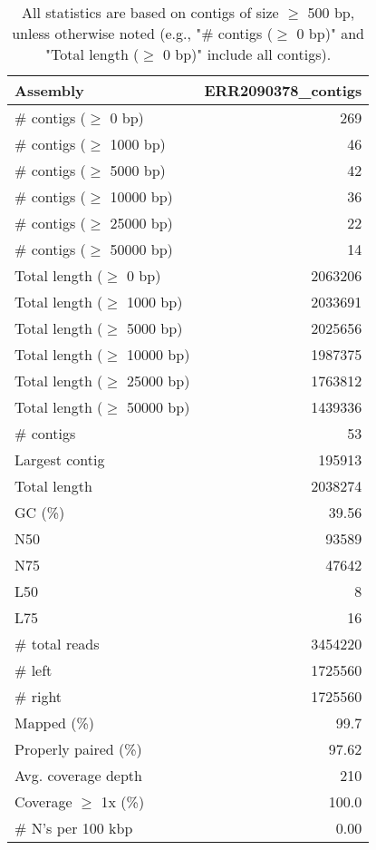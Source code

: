 \documentclass[12pt,a4paper]{article}
\begin{document}
\begin{table}[ht]
\begin{center}
\caption{All statistics are based on contigs of size $\geq$ 500 bp, unless otherwise noted (e.g., "\# contigs ($\geq$ 0 bp)" and "Total length ($\geq$ 0 bp)" include all contigs).}
\begin{tabular}{|l*{1}{|r}|}
\hline
Assembly & ERR2090378\_contigs \\ \hline
\# contigs ($\geq$ 0 bp) & 269 \\ \hline
\# contigs ($\geq$ 1000 bp) & 46 \\ \hline
\# contigs ($\geq$ 5000 bp) & 42 \\ \hline
\# contigs ($\geq$ 10000 bp) & 36 \\ \hline
\# contigs ($\geq$ 25000 bp) & 22 \\ \hline
\# contigs ($\geq$ 50000 bp) & 14 \\ \hline
Total length ($\geq$ 0 bp) & 2063206 \\ \hline
Total length ($\geq$ 1000 bp) & 2033691 \\ \hline
Total length ($\geq$ 5000 bp) & 2025656 \\ \hline
Total length ($\geq$ 10000 bp) & 1987375 \\ \hline
Total length ($\geq$ 25000 bp) & 1763812 \\ \hline
Total length ($\geq$ 50000 bp) & 1439336 \\ \hline
\# contigs & 53 \\ \hline
Largest contig & 195913 \\ \hline
Total length & 2038274 \\ \hline
GC (\%) & 39.56 \\ \hline
N50 & 93589 \\ \hline
N75 & 47642 \\ \hline
L50 & 8 \\ \hline
L75 & 16 \\ \hline
\# total reads & 3454220 \\ \hline
\# left & 1725560 \\ \hline
\# right & 1725560 \\ \hline
Mapped (\%) & 99.7 \\ \hline
Properly paired (\%) & 97.62 \\ \hline
Avg. coverage depth & 210 \\ \hline
Coverage $\geq$ 1x (\%) & 100.0 \\ \hline
\# N's per 100 kbp & 0.00 \\ \hline
\end{tabular}
\end{center}
\end{table}
\end{document}
